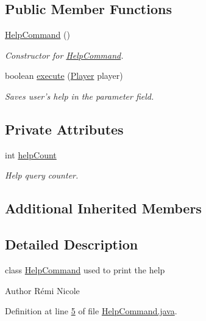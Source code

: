 \subsection*{Public Member Functions}
\begin{DoxyCompactItemize}
\item 
\hyperlink{classHelpCommand_aad2ff84710aafcbf325b91129d9827df}{Help\-Command} ()
\begin{DoxyCompactList}\small\item\em Constructor for \hyperlink{classHelpCommand}{Help\-Command}. \end{DoxyCompactList}\item 
boolean \hyperlink{classHelpCommand_ac93c4d17e1bed11f86d0f3c21ba00e34}{execute} (\hyperlink{classPlayer}{Player} player)
\begin{DoxyCompactList}\small\item\em Saves user's help in the parameter field. \end{DoxyCompactList}\end{DoxyCompactItemize}
\subsection*{Private Attributes}
\begin{DoxyCompactItemize}
\item 
int \hyperlink{classHelpCommand_a43be62a6791ea374e55433d33447124d}{help\-Count}
\begin{DoxyCompactList}\small\item\em Help query counter. \end{DoxyCompactList}\end{DoxyCompactItemize}
\subsection*{Additional Inherited Members}


\subsection{Detailed Description}
class \hyperlink{classHelpCommand}{Help\-Command} used to print the help 

\begin{DoxyAuthor}{Author}
Rémi Nicole 
\end{DoxyAuthor}


Definition at line \hyperlink{HelpCommand_8java_source_l00005}{5} of file \hyperlink{HelpCommand_8java_source}{Help\-Command.\-java}.



